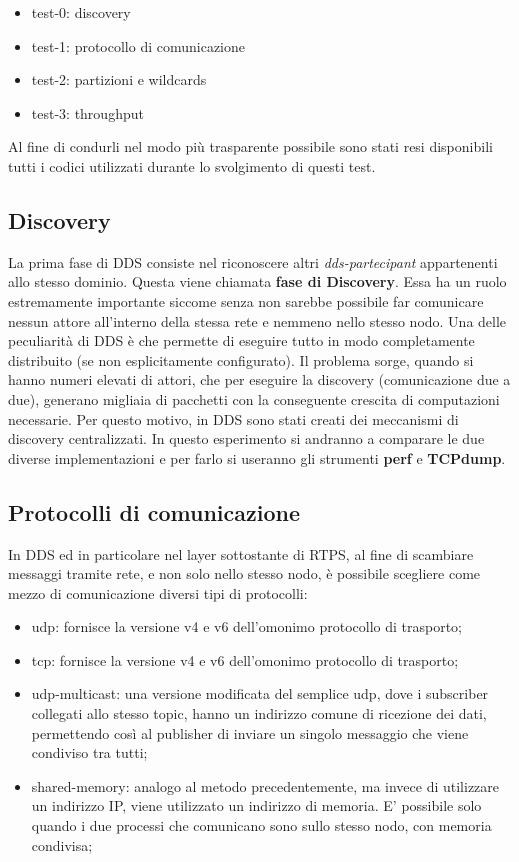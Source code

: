 \begin{itemize}
    \item test-0: discovery
    \item test-1: protocollo di comunicazione
    \item test-2: partizioni e wildcards
    \item test-3: throughput
\end{itemize}

Al fine di condurli nel modo più trasparente possibile sono stati resi disponibili~\cite{mygit} tutti i codici utilizzati durante lo svolgimento di questi test. %


\subsection{Discovery}
La prima fase di DDS consiste nel riconoscere altri \emph{dds-partecipant} appartenenti allo stesso dominio. Questa viene chiamata \textbf{fase di Discovery}. Essa ha un ruolo estremamente importante siccome senza non sarebbe possibile far comunicare nessun attore all'interno della stessa rete e nemmeno nello stesso nodo. Una delle peculiarità di DDS è che permette di eseguire tutto in modo completamente distribuito (se non esplicitamente configurato). Il problema sorge, quando si hanno numeri elevati di attori, che per eseguire la discovery (comunicazione due a due), generano migliaia di pacchetti con la conseguente crescita di  computazioni necessarie. %
Per questo motivo, in DDS sono stati creati dei meccanismi di discovery centralizzati. In questo esperimento si andranno a comparare le due diverse implementazioni e per farlo si useranno gli strumenti \textbf{perf} e \textbf{TCPdump}.

\subsection{Protocolli di comunicazione}
In DDS ed in particolare nel layer sottostante di RTPS, al fine di scambiare messaggi tramite rete, e non solo nello stesso nodo, è possibile scegliere come mezzo di comunicazione diversi tipi di protocolli:
\begin{itemize}
    \item udp: fornisce la versione v4 e v6 dell'omonimo protocollo di trasporto;
    \item tcp: fornisce la versione v4 e v6 dell'omonimo protocollo di trasporto;
    \item udp-multicast: una versione modificata del semplice udp, dove i subscriber collegati allo stesso topic, hanno un indirizzo comune di ricezione dei dati, permettendo così al publisher di inviare un singolo messaggio che viene condiviso tra tutti;
    \item shared-memory: analogo al metodo precedentemente, ma invece di utilizzare un indirizzo IP, viene utilizzato un indirizzo di memoria. E' possibile solo quando i due processi che comunicano sono sullo stesso nodo, con memoria condivisa;
\end{itemize}

